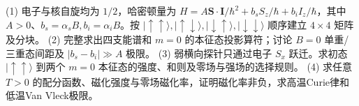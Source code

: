(1) 电子与核自旋均为 \(1/2\)，哈密顿量为 \(H=A\mathbf S\cdot\mathbf I/\hbar^2+b_s S_z/\hbar+b_i I_z/\hbar\)，其中 \(A>0\)、\(b_s=\alpha_sB,b_i=\alpha_iB\)。按 \(|\uparrow\uparrow\rangle,|\uparrow\downarrow\rangle,|\downarrow\uparrow\rangle,|\downarrow\downarrow\rangle\) 顺序建立 \(4\times4\) 矩阵及分块。
(2) 完整求出四支能谱和 \(m=0\) 的本征态投影算符；讨论 \(B=0\) 单重/三重态间距及 \(|b_s-b_i|\gg A\) 极限。
(3) 弱横向探针只通过电子 \(S_x\) 跃迁。求初态 \(|\uparrow\uparrow\rangle\) 到两个 \(m=0\) 本征态的强度、和则及零场与强场的选择规则。
(4) 求任意 \(T>0\) 的配分函数、磁化强度与零场磁化率，证明磁化率非负，求高温Curie律和低温Van Vleck极限。
